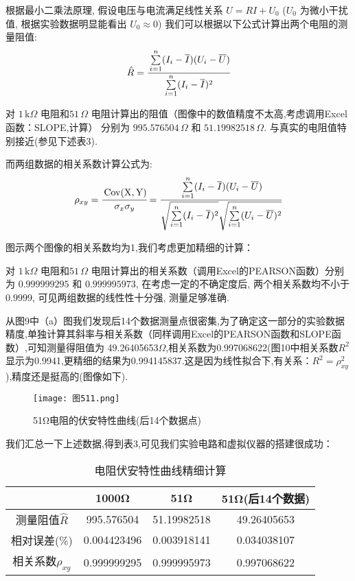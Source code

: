 \documentclass[11pt]{article}
\newcommand{\unit}[1]{\,\text{#1}}
\begin{document}
\begin{enumerate}
    \newpage
    根据最小二乘法原理, 假设电压与电流满足线性关系 $U = RI + U_0$ ($U_0$ 为微小干扰值, 
    根据实验数据明显能看出 $U_0 \approx 0$) 
    我们可以根据以下公式计算出两个电阻的测量阻值: 
    \[
        \hat{R} = \cfrac{\sum\limits_{i=1}^{n} (I_i - \overline{I}) (U_i - \overline{U})}{\sum\limits_{i=1}^{n} (I_i - \overline{I})^2}
    \]

    对 $1\unit{k$\Omega$}$ 电阻和$51\unit{$\Omega$}$ 电阻计算出的阻值（图像中的数值精度不太高,考虑调用Excel函数：SLOPE,计算）
    分别为 $995.576504\unit{$\Omega$}$ 和 $51.19982518\unit{$\Omega$}$. 
    与真实的电阻值特别接近(参见下述表3). 
    
    而两组数据的相关系数计算公式为:
    \[
        \rho_{xy} = \cfrac{\operatorname{Cov (X,Y)}} {\sigma_{x}\sigma_{y}} =  \cfrac{\sum\limits_{i=1}^{n} (I_i - \overline{I}) (U_i - \overline{U})}{\sqrt{\sum\limits_{i=1}^{n} (I_i - \overline{I})^2} \sqrt{\sum\limits_{i=1}^{n} (U_i - \overline{U})^2}}
    \]
    
    图示两个图像的相关系数均为1,我们考虑更加精细的计算：

    对 $1\unit{k$\Omega$}$ 电阻和$51\unit{$\Omega$}$ 电阻计算出的相关系数（调用Excel的PEARSON函数）分别为 $0.999999295$ 和 $0.999995973$, 
    在考虑一定的不确定度后, 两个相关系数均不小于$0.9999$, 
    可见两组数据的线性性十分强, 测量足够准确.

    从图9中（a）图我们发现后14个数据测量点很密集,为了确定这一部分的实验数据精度,单独计算其斜率与相关系数（同样调用Excel的PEARSON函数和SLOPE函数）,可知测量得阻值为
    49.26405653$\Omega$,相关系数为0.997068622(图10中相关系数$R^2$显示为0.9941,更精细的结果为0.994145837.这是因为线性拟合下,有关系：$R^2=\rho_{xy}^2$),精度还是挺高的(图像如下).

    
\begin{figure}[htbp]
    \centering
    \texttt{[image: 图511.png]}
    \caption{51Ω电阻的伏安特性曲线(后14个数据点)}
\end{figure}

我们汇总一下上述数据,得到表3,可见我们实验电路和虚拟仪器的搭建很成功：
    \begin{table}[!ht]
        \centering
        \caption{电阻伏安特性曲线精细计算}
        \begin{tabular}{cccc}
        \toprule
                  & 1000Ω & 51Ω & 51Ω(后14个数据) \\ \hline
            测量阻值$\hat R$ & 995.576504 & 51.19982518 & 49.26405653\\ 
            相对误差(\%) & 0.004423496 & 0.003918141 & 0.034038107 \\ 
            相关系数$\rho_{xy}$ & 0.999999295 & 0.999995973 & 0.997068622\\ 
        \bottomrule
        \end{tabular}
    \end{table}
    

\end{enumerate}
\end{document}
